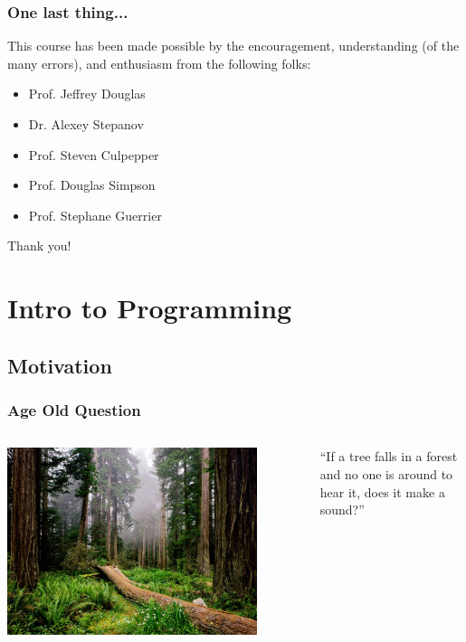 \documentclass{beamer}\usepackage[]{graphicx}\usepackage[]{color}
\begin{document}
\begin{frame}
\frametitle{One last thing...}

This course has been made possible by the encouragement, understanding (of the many errors), and enthusiasm from the following folks:

\Huge{
\begin{itemize}
\item Prof. Jeffrey Douglas
\item Dr. Alexey Stepanov
\item Prof. Steven Culpepper
\item Prof. Douglas Simpson
\item Prof. Stephane Guerrier
\end{itemize}
}

\center \huge Thank you!

\end{frame}


\section{Intro to Programming}

\subsection{Motivation}

\begin{frame}
\frametitle{Age Old Question}

\begin{columns}
\begin{column}{0.5\textwidth}
    \begin{center}
     \includegraphics[width=0.85\textwidth]{fallen_tree_in_forest}
     \end{center}
\end{column}
\begin{column}{0.5\textwidth}  %

``If a tree falls in a forest and no one is around to hear it, does it make a sound?''

\end{column}
\end{columns}

\end{frame}
\end{document}
